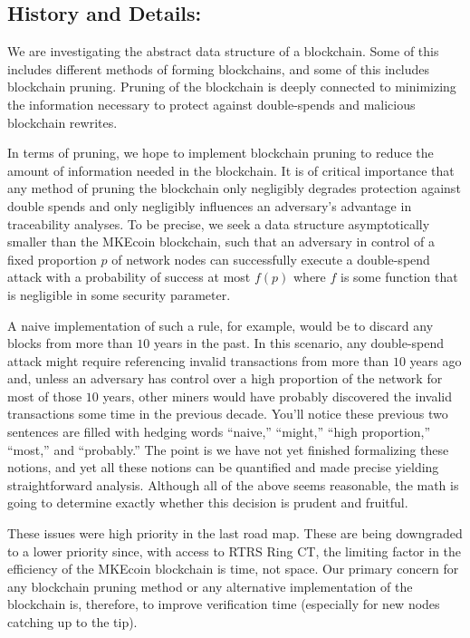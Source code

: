 \documentclass[12pt,english]{mrl}
\theoremstyle{definition}
\numberwithin{equation}{section}
\numberwithin{figure}{section}
\numberwithin{equation}{section}
\numberwithin{equation}{section}
\numberwithin{figure}{section}
\begin{document}
\subsection{History and Details:} 

We are investigating the abstract data structure of a blockchain. Some of this includes different methods of forming blockchains, and some of this includes blockchain pruning. Pruning of the blockchain is deeply connected to minimizing the information necessary to protect against double-spends and malicious blockchain rewrites.

In terms of pruning, we hope to implement blockchain pruning to reduce the amount of information needed in the blockchain. It is of critical importance that any method of pruning the blockchain only negligibly degrades protection against double spends and only negligibly influences an adversary's advantage in traceability analyses. To be precise, we seek a data structure asymptotically smaller than the MKEcoin blockchain, such that an adversary in control of a fixed proportion $p$ of network nodes can successfully execute a double-spend attack with a probability of success at most $f(p)$ where $f$ is some function that is negligible in some security parameter. 

A naive implementation of such a rule, for example, would be to discard any blocks from more than $10$ years in the past. In this scenario, any double-spend attack might require referencing invalid transactions from more than $10$ years ago and, unless an adversary has control over a high proportion of the network for most of those $10$ years, other miners would have probably discovered the invalid transactions some time in the previous decade. You'll notice these previous two sentences are filled with hedging words ``naive,'' ``might,'' ``high proportion,'' ``most,'' and ``probably.'' The point is we have not yet finished formalizing these notions, and yet all these notions can be quantified and made precise yielding straightforward analysis. Although all of the above seems reasonable, the math is going to determine exactly whether this decision is prudent and fruitful.

These issues were high priority in the last road map. These are being downgraded to a lower priority since, with access to RTRS Ring CT, the limiting factor in the efficiency of the MKEcoin blockchain is time, not space. Our primary concern for any blockchain pruning method or any alternative implementation of the blockchain is, therefore, to improve verification time (especially for new nodes catching up to the tip).
\end{document}
